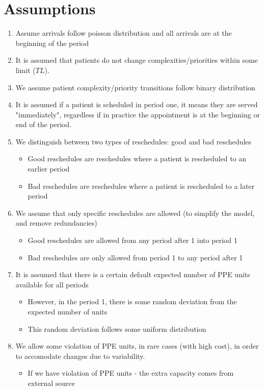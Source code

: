 \section{Assumptions} 
\begin{enumerate}
	\item Assume arrivals follow poisson distribution and all arrivals are at the beginning of the period	
	
	\item It is assumed that patients do not change complexities/priorities within some limit ($TL$). 	
	\item We assume patient complexity/priority transitions follow binary distribution
	
	\item It is assumed if a patient is scheduled in period one, it means they are served "immediately", regardless if in practice the appointment is at the beginning or end of the period.
	
	\item We distinguish between two types of reschedules: good and bad reschedules
	\begin{itemize}
		\item Good reschedules are reschedules where a patient is rescheduled to an earlier period
		\item Bad reschedules are reschedules where a patient is rescheduled to a later period
	\end{itemize}
	
	\item We assume that only specific reschedules are allowed (to simplify the model, and remove  redundancies)
	\begin{itemize}
		\item Good reschedules are allowed from any period after 1 into period 1
		\item Bad reschedules are only allowed from period 1 to any period after 1
	\end{itemize}
	
	\item It is assumed that there is a certain default expected number of PPE units available for all periods
	\begin{itemize}
		\item However, in the period 1, there is some random deviation from the expected number of units
		\item This random deviation follows some uniform distribution
	\end{itemize}
	\item We allow some violation of PPE units, in rare cases (with high cost), in order to accomodate changes due to variability.
	\begin{itemize}
		\item If we have violation of PPE units - the extra capacity comes from external source
	\end{itemize}
\end{enumerate}